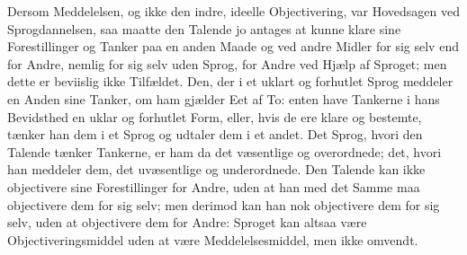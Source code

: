 \documentclass[12pt]{book}
\begin{document}
Dersom Meddelelsen, og ikke den indre, ideelle Objectivering,
var Hovedsagen ved Sprogdannelsen, saa maatte den Talende
jo antages at kunne klare sine Forestillinger og Tanker paa
en anden Maade og ved andre Midler for sig selv end for
Andre, nemlig for sig selv uden Sprog, for Andre ved Hjælp
af Sproget; men dette er beviislig ikke Tilfældet. Den, der
i et uklart og forhutlet Sprog meddeler en Anden sine Tanker,
om ham gjælder Eet af To: enten have Tankerne i hans Bevidsthed
en uklar og forhutlet Form, eller, hvis de ere klare
og bestemte, tænker han dem i et Sprog og udtaler dem i et
andet. Det Sprog, hvori den Talende tænker Tankerne, er
ham da det væsentlige og overordnede; det, hvori han meddeler
dem, det uvæsentlige og underordnede. Den Talende
kan ikke objectivere sine Forestillinger for Andre, uden at
han med det Samme maa objectivere dem for sig selv; men
derimod kan han nok objectivere dem for sig selv, uden at
objectivere dem for Andre: Sproget kan altsaa være Objectiveringsmiddel
uden at være Meddelelsesmiddel, men ikke
omvendt.
\end{document}
